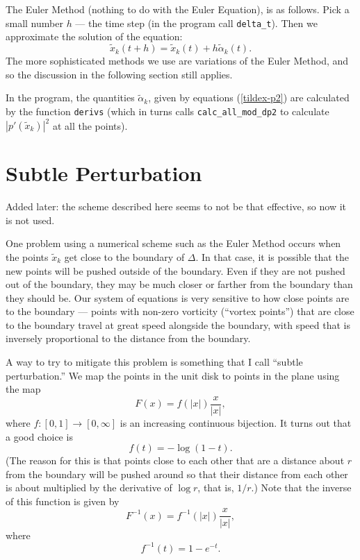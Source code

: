 \documentclass[12pt]{article}
\begin{document}
The Euler Method
(nothing to do with the Euler Equation), is as
follows.  Pick a small number $h$ --- the time step (in
the program call {\tt delta\_t}).  Then we approximate
the solution of the equation:
\begin{equation}
\label{method-simple}
\tilde x_k(t+h) = \tilde x_k(t) + h \tilde\alpha_k(t) .
\end{equation}
The more sophisticated methods we use are variations of
the Euler Method, and so the discussion in the following section
still applies.

In the program, the quantities $\tilde\alpha_k$, given by
equations (\ref{tildex-p2}) are calculated by the function
{\tt derivs}
(which in turns calls {\tt calc\_all\_mod\_dp2} to
calculate $|p'(\tilde x_k)|^2$ at all the points).


\section{Subtle Perturbation}

Added later: the scheme described here seems to not be that effective,
so now it is not used.

One problem using a numerical scheme such as the Euler Method occurs
when the points $\tilde x_k$ get close to the boundary
of $\Delta$.  In that case, it is possible that the new
points will be pushed outside of the boundary.  Even if they
are not pushed out of the boundary, they may be much closer
or farther from the boundary than they should be.
Our system of equations is very sensitive to how close points
are to the boundary --- points with non-zero vorticity
(``vortex points'') that are close to the boundary travel
at great speed alongside the boundary, with speed that is
inversely proportional to the distance from the boundary.

A way to try to mitigate this problem is something that I call
``subtle perturbation.''
We map the points in
the unit disk to points in the plane using the map
\begin{equation*}
F(x) = f(|x|) \frac x{|x|} ,
\end{equation*}
where $f:[0,1]\to[0,\infty]$ is an increasing continuous
bijection.  It turns out that a good choice is
\begin{equation*}
f(t) = -\log(1-t) .
\end{equation*}
(The reason for this is that points close to each other
that are a distance
about $r$ from the boundary will be pushed around so that
their distance from each other is about multiplied by the
derivative of $\log r$, that is, $1/r$.)
Note that the inverse of this function is given by
\begin{equation*}
F^{-1}(x) = f^{-1}(|x|) \frac x{|x|} ,
\end{equation*}
where 
\begin{equation*}
f^{-1}(t) = 1-e^{-t} .
\end{equation*}
\end{document}
